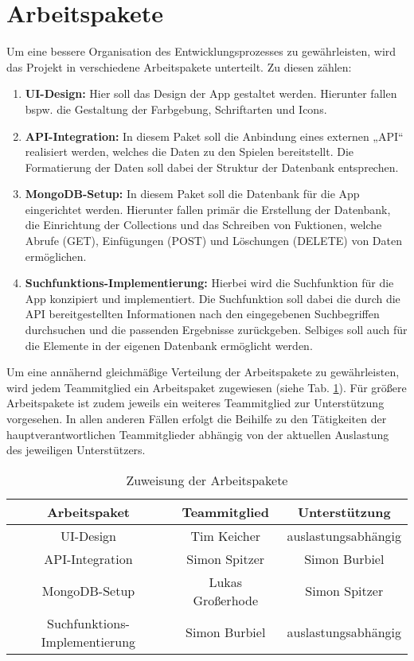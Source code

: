 \section{Arbeitspakete}
Um eine bessere Organisation des Entwicklungsprozesses zu gewährleisten, wird das Projekt in verschiedene Arbeitspakete unterteilt. Zu diesen zählen:
\begin{enumerate}
    \item \textbf{UI-Design:} Hier soll das Design der App gestaltet werden. Hierunter fallen bspw. die Gestaltung der Farbgebung, Schriftarten und Icons.
    \item \textbf{API-Integration:} In diesem Paket soll die Anbindung eines externen „\ac{API}“ realisiert werden, welches die Daten zu den Spielen bereitstellt. Die Formatierung der Daten soll dabei der Struktur der Datenbank entsprechen.
    \item \textbf{MongoDB-Setup:} In diesem Paket soll die Datenbank für die App eingerichtet werden. Hierunter fallen primär die Erstellung der Datenbank, die Einrichtung der Collections und das Schreiben von Fuktionen, welche Abrufe (GET), Einfügungen (POST) und Löschungen (DELETE) von Daten ermöglichen.
    \item \textbf{Suchfunktions-Implementierung:} Hierbei wird die Suchfunktion für die App konzipiert und implementiert. Die Suchfunktion soll dabei die durch die \ac{API} bereitgestellten Informationen nach den eingegebenen Suchbegriffen durchsuchen und die passenden Ergebnisse zurückgeben. Selbiges soll auch für die Elemente in der eigenen Datenbank ermöglicht werden.
\end{enumerate}
Um eine annähernd gleichmäßige Verteilung der Arbeitspakete zu gewährleisten, wird jedem Teammitglied ein Arbeitspaket zugewiesen (siehe Tab. \ref{tab:arbeitspakete}).
Für größere Arbeitspakete ist zudem jeweils ein weiteres Teammitglied zur Unterstützung vorgesehen.
In allen anderen Fällen erfolgt die Beihilfe zu den Tätigkeiten der hauptverantwortlichen Teammitglieder abhängig von der aktuellen Auslastung des jeweiligen Unterstützers.
\begin{table}[H]
    \centering
    \begin{tabular}{|c|c|c|}
        \hline
        \textbf{Arbeitspaket} & \textbf{Teammitglied} & \textbf{Unterstützung} \\
        \hline
        UI-Design & Tim Keicher & auslastungsabhängig \\
        API-Integration & Simon Spitzer & Simon Burbiel \\
        MongoDB-Setup & Lukas Großerhode & Simon Spitzer \\
        Suchfunktions-Implementierung & Simon Burbiel & auslastungsabhängig \\
        \hline
    \end{tabular}
    \caption{Zuweisung der Arbeitspakete}
    \label{tab:arbeitspakete}
\end{table}